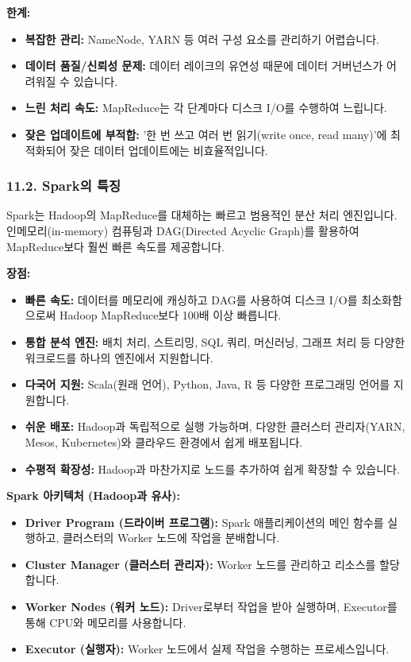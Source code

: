 \documentclass[11pt,a4paper]{article}
\theoremstyle{definition}
\begin{document}
\textbf{한계:}
\begin{itemize}
    \item \textbf{복잡한 관리:} NameNode, YARN 등 여러 구성 요소를 관리하기 어렵습니다.
    \item \textbf{데이터 품질/신뢰성 문제:} 데이터 레이크의 유연성 때문에 데이터 거버넌스가 어려워질 수 있습니다.
    \item \textbf{느린 처리 속도:} MapReduce는 각 단계마다 디스크 I/O를 수행하여 느립니다.
    \item \textbf{잦은 업데이트에 부적합:} '한 번 쓰고 여러 번 읽기(write once, read many)'에 최적화되어 잦은 데이터 업데이트에는 비효율적입니다.
\end{itemize}

\subsubsection*{11.2. Spark의 특징}

\begin{summarybox}
Spark는 Hadoop의 MapReduce를 대체하는 빠르고 범용적인 분산 처리 엔진입니다. 인메모리(in-memory) 컴퓨팅과 DAG(Directed Acyclic Graph)를 활용하여 MapReduce보다 훨씬 빠른 속도를 제공합니다.
\end{summarybox}

\textbf{장점:}
\begin{itemize}
    \item \textbf{빠른 속도:} 데이터를 메모리에 캐싱하고 DAG를 사용하여 디스크 I/O를 최소화함으로써 Hadoop MapReduce보다 100배 이상 빠릅니다.
    \item \textbf{통합 분석 엔진:} 배치 처리, 스트리밍, SQL 쿼리, 머신러닝, 그래프 처리 등 다양한 워크로드를 하나의 엔진에서 지원합니다.
    \item \textbf{다국어 지원:} Scala(원래 언어), Python, Java, R 등 다양한 프로그래밍 언어를 지원합니다.
    \item \textbf{쉬운 배포:} Hadoop과 독립적으로 실행 가능하며, 다양한 클러스터 관리자(YARN, Mesos, Kubernetes)와 클라우드 환경에서 쉽게 배포됩니다.
    \item \textbf{수평적 확장성:} Hadoop과 마찬가지로 노드를 추가하여 쉽게 확장할 수 있습니다.
\end{itemize}

\textbf{Spark 아키텍처 (Hadoop과 유사):}
\begin{itemize}
    \item \textbf{Driver Program (드라이버 프로그램):} Spark 애플리케이션의 메인 함수를 실행하고, 클러스터의 Worker 노드에 작업을 분배합니다.
    \item \textbf{Cluster Manager (클러스터 관리자):} Worker 노드를 관리하고 리소스를 할당합니다.
    \item \textbf{Worker Nodes (워커 노드):} Driver로부터 작업을 받아 실행하며, Executor를 통해 CPU와 메모리를 사용합니다.
    \item \textbf{Executor (실행자):} Worker 노드에서 실제 작업을 수행하는 프로세스입니다.
\end{itemize}
\end{document}
